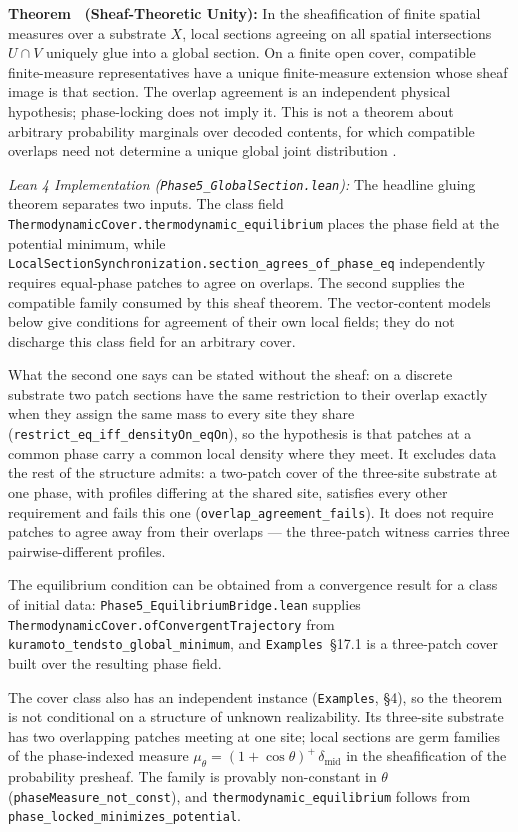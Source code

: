 \documentclass{article}
\renewcommand{\cite}[1]{\citep{#1}}
\begin{document}
\label{thm:supp-gluing}
\textbf{Theorem \thesuppresult\ (Sheaf-Theoretic Unity):} In the sheafification of finite spatial measures over a substrate $X$, local sections agreeing on all spatial intersections $U \cap V$ uniquely glue into a global section. On a finite open cover, compatible finite-measure representatives have a unique finite-measure extension whose sheaf image is that section. The overlap agreement is an independent physical hypothesis; phase-locking does not imply it. This is not a theorem about arbitrary probability marginals over decoded contents, for which compatible overlaps need not determine a unique global joint distribution \cite{abramsky2011}.

\textit{Lean 4 Implementation (\nolinkurl{Phase5_GlobalSection.lean}):} The headline gluing theorem separates two inputs. The class field \nolinkurl{ThermodynamicCover.thermodynamic_equilibrium} places the phase field at the potential minimum, while \nolinkurl{LocalSectionSynchronization.section_agrees_of_phase_eq} independently requires equal-phase patches to agree on overlaps. The second supplies the compatible family consumed by this sheaf theorem. The vector-content models below give conditions for agreement of their own local fields; they do not discharge this class field for an arbitrary cover.

What the second one says can be stated without the sheaf: on a discrete substrate two patch sections have the same restriction to their overlap exactly when they assign the same mass to every site they share (\nolinkurl{restrict_eq_iff_densityOn_eqOn}), so the hypothesis is that patches at a common phase carry a common local density where they meet. It excludes data the rest of the structure admits: a two-patch cover of the three-site substrate at one phase, with profiles differing at the shared site, satisfies every other requirement and fails this one (\nolinkurl{overlap_agreement_fails}). It does not require patches to agree away from their overlaps --- the three-patch witness carries three pairwise-different profiles.

The equilibrium condition can be obtained from a convergence result for a class of initial data: \nolinkurl{Phase5_EquilibriumBridge.lean} supplies \nolinkurl{ThermodynamicCover.ofConvergentTrajectory} from \nolinkurl{kuramoto_tendsto_global_minimum}, and \texttt{Examples}~\S17.1 is a three-patch cover built over the resulting phase field.

The cover class also has an independent instance (\texttt{Examples}, \S4), so the theorem is not conditional on a structure of unknown realizability. Its three-site substrate has two overlapping patches meeting at one site; local sections are germ families of the phase-indexed measure $\mu_\theta = (1+\cos\theta)^{+}\,\delta_{\mathrm{mid}}$ in the sheafification of the probability presheaf. The family is provably non-constant in $\theta$ (\nolinkurl{phaseMeasure_not_const}), and \nolinkurl{thermodynamic_equilibrium} follows from \nolinkurl{phase_locked_minimizes_potential}.
\end{document}
